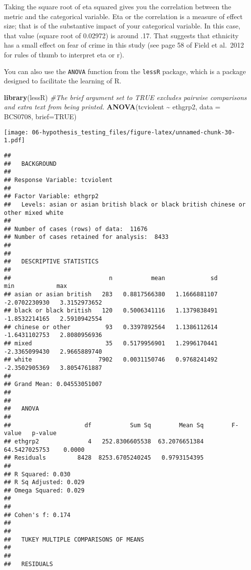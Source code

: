 \documentclass[
]{book}
\newenvironment{Shaded}{\begin{snugshade}}{\end{snugshade}}
\newcommand{\AttributeTok}[1]{\textcolor[rgb]{0.13,0.29,0.53}{#1}}
\newcommand{\CommentTok}[1]{\textcolor[rgb]{0.56,0.35,0.01}{\textit{#1}}}
\newcommand{\ConstantTok}[1]{\textcolor[rgb]{0.56,0.35,0.01}{#1}}
\newcommand{\FunctionTok}[1]{\textcolor[rgb]{0.13,0.29,0.53}{\textbf{#1}}}
\newcommand{\NormalTok}[1]{#1}
\newcommand{\SpecialCharTok}[1]{\textcolor[rgb]{0.81,0.36,0.00}{\textbf{#1}}}
\begin{document}
Taking the square root of eta squared gives you the correlation between the metric and the categorical variable. Eta or the correlation is a measure of effect size; that is of the substantive impact of your categorical variable. In this case, that value (square root of 0.02972) is around .17. That suggests that ethnicity has a small effect on fear of crime in this study (see page 58 of Field et al.~2012 for rules of thumb to interpret eta or r).

You can also use the \texttt{ANOVA} function from the \texttt{lessR} package, which is a package designed to facilitate the learning of R.

\begin{Shaded}
\begin{Highlighting}[]
\FunctionTok{library}\NormalTok{(lessR)}
\CommentTok{\#The brief argument set to TRUE excludes pairwise comparisons and extra text from being printed.}
\FunctionTok{ANOVA}\NormalTok{(tcviolent }\SpecialCharTok{\textasciitilde{}}\NormalTok{ ethgrp2, }\AttributeTok{data =}\NormalTok{ BCS0708, }\AttributeTok{brief=}\ConstantTok{TRUE}\NormalTok{) }
\end{Highlighting}
\end{Shaded}

\texttt{[image: 06-hypothesis\_testing\_files/figure-latex/unnamed-chunk-30-1.pdf]}

\begin{verbatim}
## 
##   BACKGROUND 
## 
## Response Variable: tcviolent 
##  
## Factor Variable: ethgrp2 
##   Levels: asian or asian british black or black british chinese or other mixed white 
##  
## Number of cases (rows) of data:  11676 
## Number of cases retained for analysis:  8433 
## 
## 
##   DESCRIPTIVE STATISTICS  
## 
##                            n           mean             sd             min            max 
## asian or asian british   283   0.8817566380   1.1666881107   -2.0702230930   3.3152973652 
## black or black british   120   0.5006341116   1.1379838491   -1.8532214165   2.5910942554 
## chinese or other          93   0.3397892564   1.1386112614   -1.6431102753   2.8080956936 
## mixed                     35   0.5179956901   1.2996170441   -2.3365099430   2.9665889740 
## white                   7902   0.0031150746   0.9768241492   -2.3502905369   3.8054761887 
##  
## Grand Mean: 0.04553051007 
## 
## 
##   ANOVA 
## 
##                     df           Sum Sq        Mean Sq        F-value   p-value 
## ethgrp2              4   252.8306605538  63.2076651384 64.5427025753    0.0000 
## Residuals         8428  8253.6705240245   0.9793154395 
## 
## R Squared: 0.030 
## R Sq Adjusted: 0.029 
## Omega Squared: 0.029 
##  
## 
## Cohen's f: 0.174 
## 
## 
##   TUKEY MULTIPLE COMPARISONS OF MEANS 
## 
## 
##   RESIDUALS
\end{verbatim}
\end{document}
